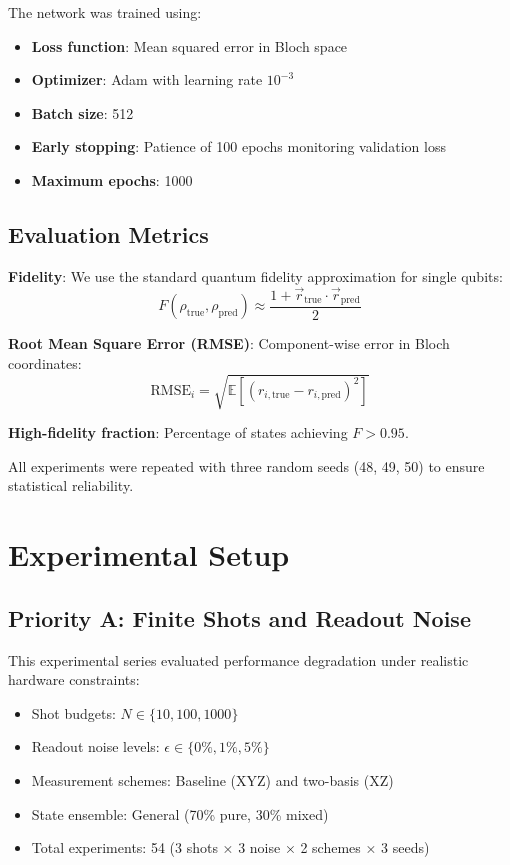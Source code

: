 \documentclass[conference]{IEEEtran}
\begin{document}
The network was trained using:
\begin{itemize}
    \item \textbf{Loss function}: Mean squared error in Bloch space
    \item \textbf{Optimizer}: Adam with learning rate $10^{-3}$
    \item \textbf{Batch size}: 512
    \item \textbf{Early stopping}: Patience of 100 epochs monitoring validation loss
    \item \textbf{Maximum epochs}: 1000
\end{itemize}

\subsection{Evaluation Metrics}

\textbf{Fidelity}: We use the standard quantum fidelity approximation for single qubits:
\begin{equation}
F(\rho_{\text{true}}, \rho_{\text{pred}}) \approx \frac{1 + \vec{r}_{\text{true}} \cdot \vec{r}_{\text{pred}}}{2}
\end{equation}

\textbf{Root Mean Square Error (RMSE)}: Component-wise error in Bloch coordinates:
\begin{equation}
\text{RMSE}_i = \sqrt{\mathbb{E}[(r_{i,\text{true}} - r_{i,\text{pred}})^2]}
\end{equation}

\textbf{High-fidelity fraction}: Percentage of states achieving $F > 0.95$.

All experiments were repeated with three random seeds (48, 49, 50) to ensure statistical reliability.

\section{Experimental Setup}

\subsection{Priority A: Finite Shots and Readout Noise}

This experimental series evaluated performance degradation under realistic hardware constraints:
\begin{itemize}
    \item Shot budgets: $N \in \{10, 100, 1000\}$
    \item Readout noise levels: $\epsilon \in \{0\%, 1\%, 5\%\}$
    \item Measurement schemes: Baseline (XYZ) and two-basis (XZ)
    \item State ensemble: General (70\% pure, 30\% mixed)
    \item Total experiments: 54 (3 shots × 3 noise × 2 schemes × 3 seeds)
\end{itemize}
\end{document}
